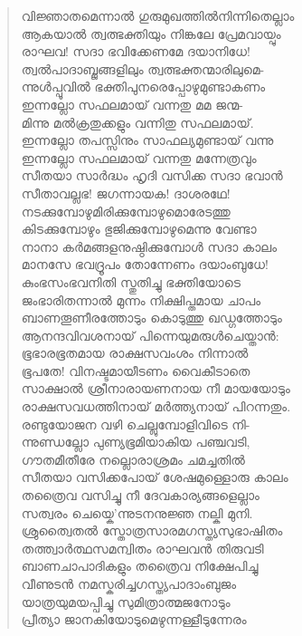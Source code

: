 \begin{verse}
വിജ്ഞാതമെന്നാല്‍ ഗുരുമുഖത്തില്‍നിന്നിതെല്ലാം\\
ആകയാല്‍ ത്വത്ഭക്തിയും നിങ്കലേ പ്രേമവായ്പും\\
രാഘവ! സദാ ഭവിക്കേണമേ ദയാനിധേ!\\
ത്വല്‍പാദാബ്ജങ്ങളിലും ത്വത്ഭക്തന്മാരിലുമെ-\\
ന്നുള്‍പ്പൂവില്‍ ഭക്തിപുനരെപ്പോഴുമുണ്ടാകണം\\
ഇന്നല്ലോ സഫലമായ് വന്നതു മമ ജന്മ-\\
മിന്നു മല്‍ക്രതുക്കളും വന്നിതു സഫലമായ്.\\
ഇന്നല്ലോ തപസ്സിനും സാഫല്യമുണ്ടായ് വന്നു\\
ഇന്നല്ലോ സഫലമായ് വന്നതു മന്നേത്രവും\\
സീതയാ സാര്‍ദ്ധം ഹൃദി വസിക്ക സദാ ഭവാന്‍\\
സീതാവല്ലഭ! ജഗന്നായക! ദാശരഥേ!\\
നടക്കുമ്പോഴുമിരിക്കുമ്പോഴുമൊരേടത്തു\\
കിടക്കുമ്പോഴും ഭുജിക്കുമ്പോഴുമെന്നു വേണ്ടാ\\
നാനാ കര്‍മങ്ങളനുഷ്ഠിക്കുമ്പോള്‍ സദാ കാലം\\
മാനസേ ഭവദ്രൂപം തോന്നേണം ദയാംബുധേ!\\
കുംഭസംഭവനിതി സ്തുതിച്ചു ഭക്തിയോടെ\\
ജംഭാരിതന്നാല്‍ മുന്നം നിക്ഷിപ്തമായ ചാപം\\
ബാണതൂണീരത്തോടും കൊടുത്തു ഖഡ്ഗത്തോടും\\
ആനന്ദവിവശനായ് പിന്നെയുമരുള്‍ചെയ്താന്‍:\\
ഭൂഭാരഭൂതമായ രാക്ഷസവംശം നിന്നാല്‍\\
ഭൂപതേ! വിനഷ്ടമായീടണം വൈകീടാതെ\\
സാക്ഷാല്‍ ശ്രീനാരായണനായ നീ മായയോടും\\
രാക്ഷസവധത്തിനായ് മര്‍ത്ത്യനായ് പിറന്നതും.\\
രണ്ടുയോജന വഴി ചെല്ലുമ്പോളിവിടെ നി-\\
ന്നുണ്ഡല്ലോ പുണ്യഭൂമിയാകിയ പഞ്ചവടി,\\
ഗൗതമീതീരേ നല്ലൊരാശ്രമം ചമച്ചതില്‍\\
സീതയാ വസിക്കപോയ് ശേഷമുള്ളൊരു കാലം\\
തത്രൈവ വസിച്ചു നീ ദേവകാര്യങ്ങളെല്ലാം\\
സത്വരം ചെയ്കെ’ന്നുടനനുജ്ഞ നല്കി മുനി.\\
ശ്രുത്വൈതല്‍ സ്തോത്രസാരമഗസ്ത്യസുഭാഷിതം\\
തത്ത്വാര്‍ത്ഥസമന്വിതം രാഘവന്‍ തിരുവടി\\
ബാണചാപാദികളും തത്രൈവ നിക്ഷേപിച്ചു\\
വീണുടന്‍ നമസ്കരിച്ചഗസ്ത്യപാദാംബുജം\\
യാത്രയുമയപ്പിച്ചു സുമിത്രാത്മജനോടും\\
പ്രീത്യാ ജാനകിയോടുമെഴുന്നള്ളീടുന്നേരം
\end{verse}

